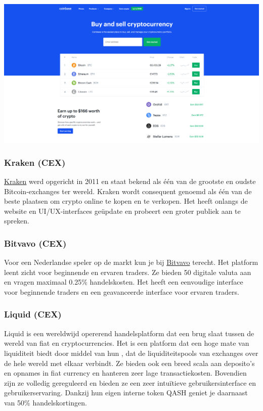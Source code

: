 \begin{borderbox}
    \includegraphics[width=\textwidth]{img/ch-exchanges/coinbase.png}
\end{borderbox}

\subsubsection*{Kraken (CEX)}
\href{https://www.kraken.com/}{Kraken} werd opgericht in 2011 en staat bekend als {\'e}{\'e}n van de grootste en oudste Bitcoin-exchanges ter wereld. Kraken wordt consequent genoemd als {\'e}{\'e}n van de beste plaatsen om crypto online te kopen en te verkopen. Het heeft onlangs de website en UI/UX-interfaces ge{\"u}pdate en probeert een groter publiek aan te spreken. 

\subsubsection*{Bitvavo (CEX)}
Voor een Nederlandse speler op de markt kun je bij \href{https://bitvavo.com/nl}{Bitvavo} terecht. Het platform leent zicht voor beginnende en ervaren traders. Ze bieden 50 digitale valuta aan en vragen maximaal 0.25\% handelskosten. Het heeft een eenvoudige interface voor beginnende traders en een geavanceerde interface voor ervaren traders.
 
\subsubsection*{Liquid (CEX)}
 Liquid is een wereldwijd opererend handelsplatform dat een brug slaat tussen de wereld van fiat en cryptocurrencies. Het is een platform dat een hoge mate van liquiditeit biedt door middel van hun , dat de liquiditeitspools van exchanges over de hele wereld met elkaar verbindt. Ze bieden ook een breed scala aan deposito's en opnames in fiat currency en hanteren zeer lage transactiekosten. Bovendien zijn ze volledig gereguleerd en bieden ze een zeer intu{\"i}tieve gebruikersinterface en gebruikerservaring. Dankzij hun eigen interne token QASH geniet je daarnaast van 50\% handelskortingen.\medskip

